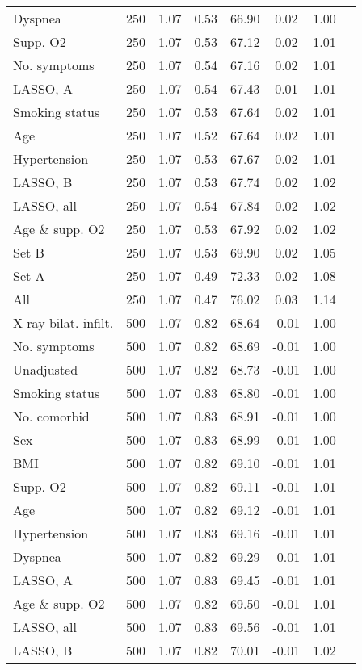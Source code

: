 \documentclass{article}
\begin{document}
{\begin{longtable}{lccccccc}
Dyspnea & 250 & 1.07 & 0.53 & 66.90 & 0.02 & 1.00\\
Supp. O2 & 250 & 1.07 & 0.53 & 67.12 & 0.02 & 1.01\\
No. symptoms & 250 & 1.07 & 0.54 & 67.16 & 0.02 & 1.01\\
LASSO, A & 250 & 1.07 & 0.54 & 67.43 & 0.01 & 1.01\\
Smoking status & 250 & 1.07 & 0.53 & 67.64 & 0.02 & 1.01\\
Age & 250 & 1.07 & 0.52 & 67.64 & 0.02 & 1.01\\
Hypertension & 250 & 1.07 & 0.53 & 67.67 & 0.02 & 1.01\\
LASSO, B & 250 & 1.07 & 0.53 & 67.74 & 0.02 & 1.02\\
LASSO, all & 250 & 1.07 & 0.54 & 67.84 & 0.02 & 1.02\\
Age \& supp. O2 & 250 & 1.07 & 0.53 & 67.92 & 0.02 & 1.02\\
Set B & 250 & 1.07 & 0.53 & 69.90 & 0.02 & 1.05\\
Set A & 250 & 1.07 & 0.49 & 72.33 & 0.02 & 1.08\\
All & 250 & 1.07 & 0.47 & 76.02 & 0.03 & 1.14\\ \midrule
X-ray bilat. infilt. & 500 & 1.07 & 0.82 & 68.64 & -0.01 & 1.00\\
No. symptoms & 500 & 1.07 & 0.82 & 68.69 & -0.01 & 1.00\\
Unadjusted & 500 & 1.07 & 0.82 & 68.73 & -0.01 & 1.00\\
Smoking status & 500 & 1.07 & 0.83 & 68.80 & -0.01 & 1.00\\
No. comorbid & 500 & 1.07 & 0.83 & 68.91 & -0.01 & 1.00\\
Sex & 500 & 1.07 & 0.83 & 68.99 & -0.01 & 1.00\\
BMI & 500 & 1.07 & 0.82 & 69.10 & -0.01 & 1.01\\
Supp. O2 & 500 & 1.07 & 0.82 & 69.11 & -0.01 & 1.01\\
Age & 500 & 1.07 & 0.82 & 69.12 & -0.01 & 1.01\\
Hypertension & 500 & 1.07 & 0.83 & 69.16 & -0.01 & 1.01\\
Dyspnea & 500 & 1.07 & 0.82 & 69.29 & -0.01 & 1.01\\
LASSO, A & 500 & 1.07 & 0.83 & 69.45 & -0.01 & 1.01\\
Age \& supp. O2 & 500 & 1.07 & 0.82 & 69.50 & -0.01 & 1.01\\
LASSO, all & 500 & 1.07 & 0.83 & 69.56 & -0.01 & 1.01\\
LASSO, B & 500 & 1.07 & 0.82 & 70.01 & -0.01 & 1.02\\

\end{longtable}}
\end{document}

